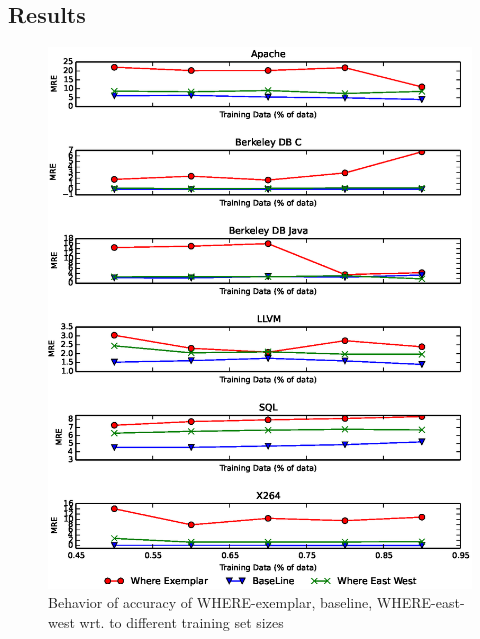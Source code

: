 \documentclass{sig-alternative}
\begin{document}
\subsection{Results}
\begin{figure}[!t]
\includegraphics[width=1.0\linewidth]{Figures/SamplingAccuracy.eps}
\caption{Behavior of accuracy of WHERE-exemplar, baseline, WHERE-east-west wrt. to different training set sizes }\label{fig:sampling_accuracy}
\end{figure}
\end{document}
